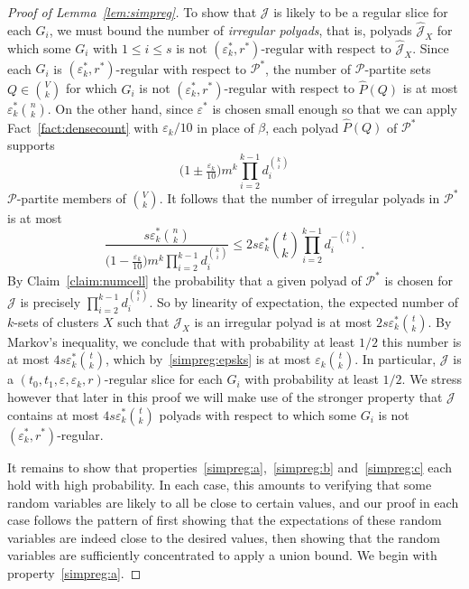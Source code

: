 \documentclass[12pt,a4paper]{amsart}
\let\eps\varepsilon
\newcommand{\cJ}{\mathcal{J}}
\newcommand{\Part}{\mathcal{P}}
\begin{document}
\begin{proof}[Proof of Lemma~\ref{lem:simpreg}]
To show that $\cJ$ is likely to be a regular slice for each $G_i$, we must bound the
number of \emph{irregular polyads}, that is, polyads $\hat{\cJ}_X$ for which some $G_i$ with $1\le i\le s$ is not $(\eps^*_k,
r^*)$-regular with respect to $\hat{\cJ}_X$. Since each $G_i$ is $(\eps^*_k,r^*)$-regular with respect to $\Part^*$, the number of $\Part$-partite sets $Q \in \binom{V}{k}$ for which $G_i$ is not $(\eps_k^*,r^*)$-regular with respect to $\hat{P}(Q)$ is at most $\eps_k^*\binom{n}{k}$. On the other hand, since $\eps^*$ is chosen small enough so that we can apply Fact~\ref{fact:densecount} with $\eps_k/10$ in place of $\beta$, each
polyad $\hat{P}(Q)$ of $\Part^*$ supports
\[\big(1 \pm \tfrac{\eps_k}{10}\big) m^k \prod_{i=2}^{k-1} d_i^{\binom{k}{i}}\]
$\Part$-partite members of $\binom{V}{k}$. It follows that the number of irregular polyads in $\Part^*$ is at most
\begin{equation}
\label{eq:irregpoly}
\frac{s\eps_k^*\binom{n}{k}}{\big(1 - \tfrac{\eps_k}{10}\big)m^k\prod_{i=2}^{k-1} d_i^{\binom{k}{i}}}\le 2 s \eps^*_k \binom{t}{k} \prod_{i=2}^{k-1}
d_i^{-\binom{k}{i}}\,.
\end{equation}
By Claim~\ref{claim:numcell} the probability that a given polyad of $\Part^*$ is chosen
for $\cJ$ is precisely $\prod_{i=2}^{k-1} d_i^{\binom{k}{i}}$. So by linearity of expectation, the expected number of $k$-sets of clusters $X$ such that $\cJ_X$ is an irregular polyad is at
most $2s \eps^*_k \binom{t}{k}$. By Markov's inequality, we conclude that
with probability at least $1/2$ this number is at most $4s \eps^*_k
\binom{t}{k}$, which by~\eqref{simpreg:epsks} is at most $\eps_k
\binom{t}{k}$. In particular, $\cJ$ is a $(t_0, t_1, \eps, \eps_k,
r)$-regular slice for each $G_i$ with probability
at least $1/2$. We stress however that later in this proof we will make use of the stronger property that $\cJ$ contains at most $4s\eps^*_k\binom{t}{k}$ polyads with respect to which some $G_i$ is not $(\eps^*_k,r^*)$-regular.

It remains to show that properties~\ref{simpreg:a},~\ref{simpreg:b}
and~\ref{simpreg:c} each hold with high probability. In each case, this
amounts to verifying that some random variables are likely to all
be close to certain values, and our proof in each case follows the pattern of
first showing that the expectations of these random variables are indeed close
to the desired values, then showing that the random variables are sufficiently
concentrated to apply a union bound. We begin with property~\ref{simpreg:a}.


\end{proof}
\end{document}
